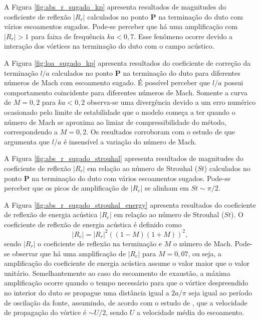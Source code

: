 A Figura \ref{fig:abs_r_sugado_kp} apresenta resultados de magnitudes do coeficiente de reflexão $|R_{r}|$ calculados no ponto $\textbf{P}$ na terminação do duto com vários escoamentos sugados. Pode-se perceber que há uma amplificação com $|R_{r}| > 1$ para faixa de frequência $ka < 0,7$. Esse fenômeno ocorre devido a interação dos vórtices na terminação do duto com o campo acústico.

A Figura \ref{fig:loa_sugado_kp} apresenta resultados do coeficiente de correção da terminação $l/a$ calculados no ponto $\textbf{P}$ na terminação do duto para diferentes números de Mach com escoamento sugado. É possível perceber que $l/a$ possui comportamento coincidente para diferentes números de Mach. Somente a curva de $M = 0,2$ para $ka < 0,2$ observa-se uma divergência devido a um erro numérico ocasionado pelo limite de estabilidade que o modelo começa a ter quando o número de Mach se aproxima ao limiar de compressibilidade do método, correspondendo a $M = 0,2$. Os resultados corroboram com o estudo de  que argumenta que $l/a$ é insensível a variação do número de Mach.  

\newpage
\begin{figure}[h!]
  \centering
  
\end{figure}

\begin{figure}[ht!]
  \centering
  
\end{figure}

\newpage
 A Figura \ref{fig:abs_r_sugado_strouhal} apresenta resultados de magnitudes do coeficiente de reflexão $|R_{r}|$ em relação ao número de Strouhal ($St$) calculados no ponto $\textbf{P}$ na terminação do duto com vários escoamentos sugados. Pode-se perceber que os picos de amplificação de $|R_{r}|$ se alinham em $St \sim \pi/2$.


\begin{figure}[ht!]
\centering
  
\end{figure}


A Figura \ref{fig:abs_r_sugado_strouhal_energy} apresenta resultados do coeficiente de reflexão de energia acústica $|R_{e}|$ em relação ao número de Strouhal ($St$). O coeficiente de reflexão de energia acústica é definido como 
\begin{equation}
 |R_{e}| = |R_{r}|^{2}((1 - M)(1 + M))^{2}, 
\end{equation}
sendo $|R_{r}|$ o coeficiente de reflexão na terminação e $M$ o número de Mach. Pode-se observar que há uma amplificação de $|R_{e}|$ para $M = 0,07$, ou seja, a amplificação do coeficiente de energia acústica assume o valor maior que o valor unitário. Semelhantemente ao caso do escoamento de exaustão, a máxima amplificação ocorre quando o tempo necessário para que o vórtice despreendido no interior do duto se propague uma distância igual a $2a/\pi$ seja igual ao período de oscilação da fonte, assumindo, de acordo com o estudo de , que a velocidade de propagação do vórtice é $\sim U/2$, sendo $U$ a velocidade média do escoamento. 

